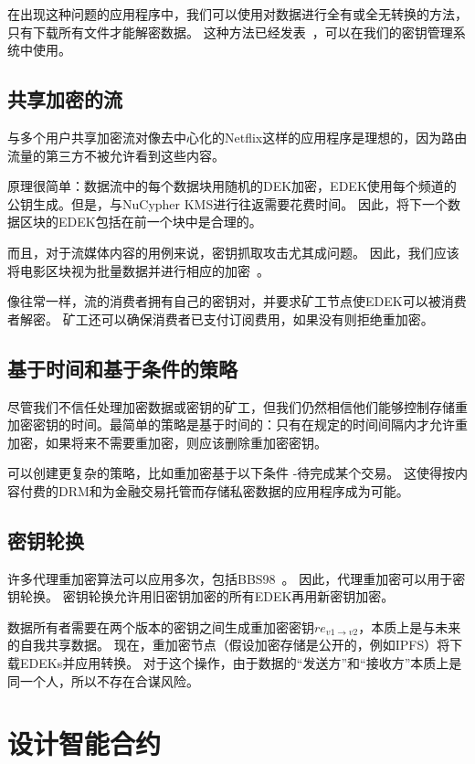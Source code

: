 \documentclass[longbibliography,nofootinbib]{revtex4-1}
\newcommand{\kms}{NuCypher KMS}
\begin{document}
    在出现这种问题的应用程序中，我们可以使用对数据进行全有或全无转换的方法，只有下载所有文件才能解密数据。 这种方法已经发表~\cite{aont-bulk}，可以在我们的密钥管理系统中使用。

\subsection{共享加密的流}

与多个用户共享加密流对像去中心化的Netflix这样的应用程序是理想的，因为路由流量的第三方不被允许看到这些内容。

    原理很简单：数据流中的每个数据块用随机的DEK加密，EDEK使用每个频道的公钥生成。但是，与\kms 进行往返需要花费时间。 因此，将下一个数据区块的EDEK包括在前一个块中是合理的。
    
    而且，对于流媒体内容的用例来说，密钥抓取攻击尤其成问题。 因此，我们应该将电影区块视为批量数据并进行相应的加密~\cite{aont-bulk}。
    
    像往常一样，流的消费者拥有自己的密钥对，并要求矿工节点使EDEK可以被消费者解密。 矿工还可以确保消费者已支付订阅费用，如果没有则拒绝重加密。


\subsection{基于时间和基于条件的策略}

    尽管我们不信任处理加密数据或密钥的矿工，但我们仍然相信他们能够控制存储重加密密钥的时间。最简单的策略是基于时间的：只有在规定的时间间隔内才允许重加密，如果将来不需要重加密，则应该删除重加密密钥。
    
    可以创建更复杂的策略，比如重加密基于以下条件 -待完成某个交易。 这使得按内容付费的DRM和为金融交易托管而存储私密数据的应用程序成为可能。


\subsection{密钥轮换}
\label{sec:key-rotation}

    许多代理重加密算法可以应用多次，包括BBS98~\cite{BBS98}。 因此，代理重加密可以用于密钥轮换。 密钥轮换允许用旧密钥加密的所有EDEK再用新密钥加密。
    
    数据所有者需要在两个版本的密钥之间生成重加密密钥$re_{v1\rightarrow v2}$，本质上是与未来的自我共享数据。 现在，重加密节点（假设加密存储是公开的，例如IPFS）将下载EDEKs并应用转换。 对于这个操作，由于数据的“发送方”和“接收方”本质上是同一个人，所以不存在合谋风险。

\section{设计智能合约}
\label{sec:smart-contract}
\end{document}
